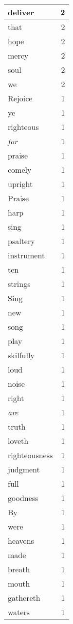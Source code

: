 \begin{center}
\begin{longtable}{l|r}
deliver & 2 \\ \hline
that & 2 \\ \hline
hope & 2 \\ \hline
mercy & 2 \\ \hline
soul & 2 \\ \hline
we & 2 \\ \hline
Rejoice & 1 \\ \hline
ye & 1 \\ \hline
righteous & 1 \\ \hline
\emph{for} & 1 \\ \hline
praise & 1 \\ \hline
comely & 1 \\ \hline
upright & 1 \\ \hline
Praise & 1 \\ \hline
harp & 1 \\ \hline
sing & 1 \\ \hline
psaltery & 1 \\ \hline
instrument & 1 \\ \hline
ten & 1 \\ \hline
strings & 1 \\ \hline
Sing & 1 \\ \hline
new & 1 \\ \hline
song & 1 \\ \hline
play & 1 \\ \hline
skilfully & 1 \\ \hline
loud & 1 \\ \hline
noise & 1 \\ \hline
right & 1 \\ \hline
\emph{are} & 1 \\ \hline
truth & 1 \\ \hline
loveth & 1 \\ \hline
righteousness & 1 \\ \hline
judgment & 1 \\ \hline
full & 1 \\ \hline
goodness & 1 \\ \hline
By & 1 \\ \hline
were & 1 \\ \hline
heavens & 1 \\ \hline
made & 1 \\ \hline
breath & 1 \\ \hline
mouth & 1 \\ \hline
gathereth & 1 \\ \hline
waters & 1 \\ \hline

\end{longtable}
\end{center}

